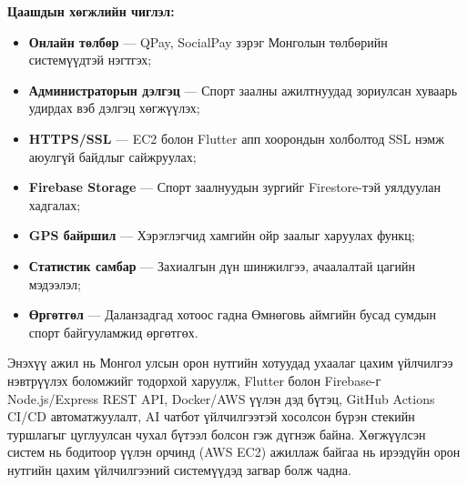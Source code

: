 \textbf{Цаашдын хөгжлийн чиглэл:}

\begin{itemize}
    \item \textbf{Онлайн төлбөр} — QPay, SocialPay зэрэг Монголын төлбөрийн системүүдтэй нэгтгэх;
    \item \textbf{Администраторын дэлгэц} — Спорт заалны ажилтнуудад зориулсан хуваарь удирдах вэб дэлгэц хөгжүүлэх;
    \item \textbf{HTTPS/SSL} — EC2 болон Flutter апп хоорондын холболтод SSL нэмж аюулгүй байдлыг сайжруулах;
    \item \textbf{Firebase Storage} — Спорт заалнуудын зургийг Firestore-тэй уялдуулан хадгалах;
    \item \textbf{GPS байршил} — Хэрэглэгчид хамгийн ойр заалыг харуулах функц;
    \item \textbf{Статистик самбар} — Захиалгын дүн шинжилгээ, ачаалалтай цагийн мэдээлэл;
    \item \textbf{Өргөтгөл} — Даланзадгад хотоос гадна Өмнөговь аймгийн бусад сумдын спорт байгууламжид өргөтгөх.
\end{itemize}

Энэхүү ажил нь Монгол улсын орон нутгийн хотуудад ухаалаг цахим үйлчилгээ нэвтрүүлэх боломжийг тодорхой харуулж, Flutter болон Firebase-г Node.js/Express REST API, Docker/AWS үүлэн дэд бүтэц, GitHub Actions CI/CD автоматжуулалт, AI чатбот үйлчилгээтэй хосолсон бүрэн стекийн туршлагыг цуглуулсан чухал бүтээл болсон гэж дүгнэж байна. Хөгжүүлсэн систем нь бодитоор үүлэн орчинд (AWS EC2) ажиллаж байгаа нь ирээдүйн орон нутгийн цахим үйлчилгээний системүүдэд загвар болж чадна.

